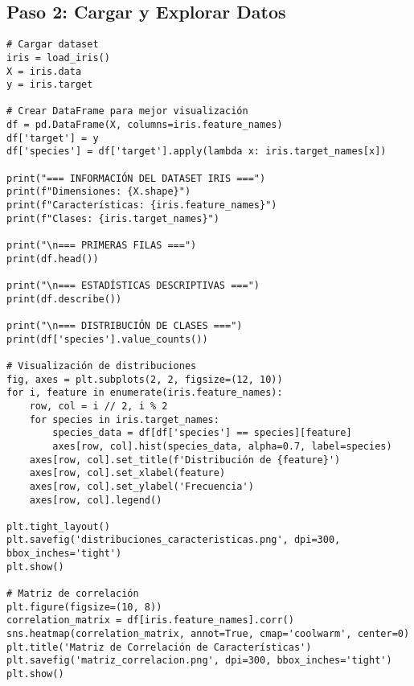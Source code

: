 \documentclass[12pt]{article}
\begin{document}
\subsection{Paso 2: Cargar y Explorar Datos}
\begin{lstlisting}
# Cargar dataset
iris = load_iris()
X = iris.data
y = iris.target

# Crear DataFrame para mejor visualización
df = pd.DataFrame(X, columns=iris.feature_names)
df['target'] = y
df['species'] = df['target'].apply(lambda x: iris.target_names[x])

print("=== INFORMACIÓN DEL DATASET IRIS ===")
print(f"Dimensiones: {X.shape}")
print(f"Características: {iris.feature_names}")
print(f"Clases: {iris.target_names}")

print("\n=== PRIMERAS FILAS ===")
print(df.head())

print("\n=== ESTADÍSTICAS DESCRIPTIVAS ===")
print(df.describe())

print("\n=== DISTRIBUCIÓN DE CLASES ===")
print(df['species'].value_counts())

# Visualización de distribuciones
fig, axes = plt.subplots(2, 2, figsize=(12, 10))
for i, feature in enumerate(iris.feature_names):
    row, col = i // 2, i % 2
    for species in iris.target_names:
        species_data = df[df['species'] == species][feature]
        axes[row, col].hist(species_data, alpha=0.7, label=species)
    axes[row, col].set_title(f'Distribución de {feature}')
    axes[row, col].set_xlabel(feature)
    axes[row, col].set_ylabel('Frecuencia')
    axes[row, col].legend()

plt.tight_layout()
plt.savefig('distribuciones_caracteristicas.png', dpi=300, bbox_inches='tight')
plt.show()

# Matriz de correlación
plt.figure(figsize=(10, 8))
correlation_matrix = df[iris.feature_names].corr()
sns.heatmap(correlation_matrix, annot=True, cmap='coolwarm', center=0)
plt.title('Matriz de Correlación de Características')
plt.savefig('matriz_correlacion.png', dpi=300, bbox_inches='tight')
plt.show()
\end{lstlisting}
\end{document}
